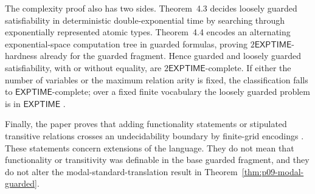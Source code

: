 The complexity proof also has two sides.  Theorem~4.3 decides loosely guarded
satisfiability in deterministic double-exponential time by searching through
exponentially represented atomic types.  Theorem~4.4 encodes an alternating
exponential-space computation tree in guarded formulas, proving
\(2\mathsf{EXPTIME}\)-hardness already for the guarded fragment.  Hence guarded
and loosely guarded satisfiability, with or without equality, are
\(2\mathsf{EXPTIME}\)-complete.  If either the number of variables or the
maximum relation arity is fixed, the classification falls to
\(\mathsf{EXPTIME}\)-complete; over a fixed finite vocabulary the loosely
guarded problem is in \(\mathsf{EXPTIME}\)
\cite[thms.~4.3--4.4 and cors.~4.5--4.6]{Gradel1999}.

Finally, the paper proves that adding functionality statements or stipulated
transitive relations crosses an undecidability boundary by finite-grid
encodings \cite[thms.~5.8 and 5.10]{Gradel1999}.  These statements concern
extensions of the language.  They do not mean that functionality or
transitivity was definable in the base guarded fragment, and they do not alter
the modal-standard-translation result in
Theorem~\ref{thm:p09-modal-guarded}.
